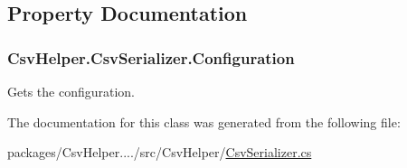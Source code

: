 \subsection{Property Documentation}
\hypertarget{a00059_a2ae1b1a629b707fbfb7d636989442f34}{
\subsubsection[{Configuration}]{ Csv\-Helper.\-Csv\-Serializer.\-Configuration\hspace{0.3cm}{\ttfamily [get]}}}\label{a00059_a2ae1b1a629b707fbfb7d636989442f34}


Gets the configuration. 



The documentation for this class was generated from the following file\-:\begin{DoxyCompactItemize}
\item 
packages/\-Csv\-Helper..../src/\-Csv\-Helper/\hyperlink{a00205}{Csv\-Serializer.\-cs}\end{DoxyCompactItemize}
